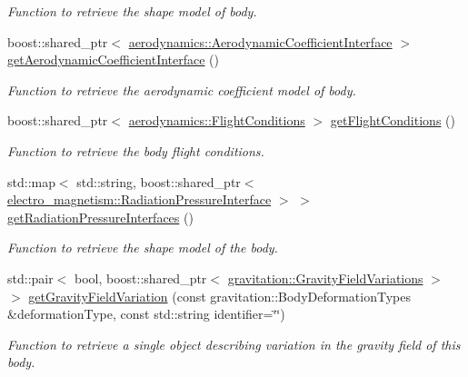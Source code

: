 \begin{DoxyCompactItemize}
\begin{DoxyCompactList}\small\item\em Function to retrieve the shape model of body. \end{DoxyCompactList}\item 
boost\+::shared\+\_\+ptr$<$ \hyperlink{classtudat_1_1aerodynamics_1_1AerodynamicCoefficientInterface}{aerodynamics\+::\+Aerodynamic\+Coefficient\+Interface} $>$ \hyperlink{classtudat_1_1simulation__setup_1_1Body_a08e15216b11433e344afc9db6a17dff8}{get\+Aerodynamic\+Coefficient\+Interface} ()
\begin{DoxyCompactList}\small\item\em Function to retrieve the aerodynamic coefficient model of body. \end{DoxyCompactList}\item 
boost\+::shared\+\_\+ptr$<$ \hyperlink{classtudat_1_1aerodynamics_1_1FlightConditions}{aerodynamics\+::\+Flight\+Conditions} $>$ \hyperlink{classtudat_1_1simulation__setup_1_1Body_abf095882cd458103d85419fc3d306cb4}{get\+Flight\+Conditions} ()
\begin{DoxyCompactList}\small\item\em Function to retrieve the body flight conditions. \end{DoxyCompactList}\item 
std\+::map$<$ std\+::string, boost\+::shared\+\_\+ptr$<$ \hyperlink{classtudat_1_1electro__magnetism_1_1RadiationPressureInterface}{electro\+\_\+magnetism\+::\+Radiation\+Pressure\+Interface} $>$ $>$ \hyperlink{classtudat_1_1simulation__setup_1_1Body_a6f17a6e2e52d0a3b88414e6c2efb2c8c}{get\+Radiation\+Pressure\+Interfaces} ()
\begin{DoxyCompactList}\small\item\em Function to retrieve the shape model of the body. \end{DoxyCompactList}\item 
std\+::pair$<$ bool, boost\+::shared\+\_\+ptr$<$ \hyperlink{classtudat_1_1gravitation_1_1GravityFieldVariations}{gravitation\+::\+Gravity\+Field\+Variations} $>$ $>$ \hyperlink{classtudat_1_1simulation__setup_1_1Body_abc45128eb00463e71cfa70f8cfec0b25}{get\+Gravity\+Field\+Variation} (const gravitation\+::\+Body\+Deformation\+Types \&deformation\+Type, const std\+::string identifier=\char`\"{}\char`\"{})
\begin{DoxyCompactList}\small\item\em Function to retrieve a single object describing variation in the gravity field of this body. \end{DoxyCompactList}\item 

\end{DoxyCompactItemize}
